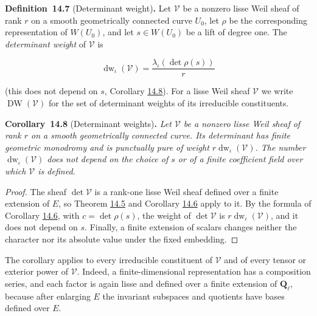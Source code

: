 \documentclass[11pt]{article}
\newenvironment{bpstatement}[2]{\par\addvspace{0.6\baselineskip}\noindent\textbf{#1}#2\textbf{.}\enspace\ignorespaces}
  {\par\addvspace{0.4\baselineskip}}
\newenvironment{bpstatementit}[2]{\begin{bpstatement}{#1}{#2}\itshape\ignorespaces}{\end{bpstatement}}
\begin{document}
\label{bp64}%
\begin{bpstatement}{Definition~14.7}{ (Determinant weight)}
Let \(\mathcal V\) be a nonzero lisse Weil sheaf of rank \(r\) on a smooth geometrically connected curve \(U_0\), let \(\rho\) be the corresponding representation of \(W(U_0)\), and let \(s\in W(U_0)\) be a lift of degree one. The \emph{determinant weight} of \(\mathcal V\) is

\[
\operatorname{dw}_\iota(\mathcal V)
=\frac{\lambda_\iota(\det\rho(s))}{r}
\]

(this does not depend on \(s\), Corollary \hyperref[bp65]{14.8}). For a lisse Weil sheaf \(\mathcal V\) we write \(\operatorname{DW}(\mathcal V)\) for the set of determinant weights of its irreducible constituents.
\end{bpstatement}

\label{bp65}%
\begin{bpstatementit}{Corollary~14.8}{ (Determinant weights)}
Let \(\mathcal V\) be a nonzero lisse Weil sheaf of rank \(r\) on a smooth geometrically connected curve.  Its determinant has finite geometric monodromy and is punctually pure of weight \(r\operatorname{dw}_\iota(\mathcal V)\). The number \(\operatorname{dw}_\iota(\mathcal V)\) does not depend on the choice of \(s\) or of a finite coefficient field over which \(\mathcal V\) is defined.
\end{bpstatementit}

\begin{proof}[{Proof}]\label{bp66}%
The sheaf \(\det\mathcal V\) is a rank-one lisse Weil sheaf defined over a finite extension of \(E\), so Theorem \hyperref[bp58]{14.5} and Corollary \hyperref[bp61]{14.6} apply to it.  By the formula of Corollary \hyperref[bp61]{14.6}, with \(c=\det\rho(s)\), the weight of \(\det\mathcal V\) is \(r\operatorname{dw}_\iota(\mathcal V)\), and it does not depend on \(s\). Finally, a finite extension of scalars changes neither the character nor its absolute value under the fixed embedding.
\end{proof}

\label{bp67}%
The corollary applies to every irreducible constituent of \(\mathcal V\) and of every tensor or exterior power of \(\mathcal V\). Indeed, a finite-dimensional representation has a composition series, and each factor is again lisse and defined over a finite extension of \(\mathbf Q_\ell\), because after enlarging \(E\) the invariant subspaces and quotients have bases defined over \(E\).
\end{document}

